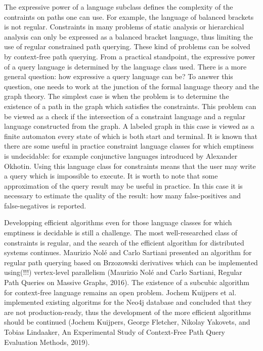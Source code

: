 \documentclass[12pt]{article}  %
\theoremstyle{remark}
\begin{document}
The expressive power of a language subclass defines the complexity of the contraints on paths one can use.
For example, the language of balanced brackets is not regular.
Constraints in many problems of static analysis or hierarchical analysis can only be expressed as a balanced bracket language, thus limiting the use of regular constrained path querying.
These kind of problems can be solved by context-free path querying.
From a practical standpoint, the expressive power of a query language is determined by the language class used.
There is a more general question: how expressive a query language can be?
To answer this question, one needs to work at the junction of the formal language theory and the graph theory.
The simplest case is when the problem is to determine the existence of a path in the graph which satisfies the constraints.
This problem can be viewed as a check if the intersection of a constraint language and a regular language constructed from the graph.
A labeled graph in this case is viewed as a finite automaton every state of which is both start and terminal.
It is known that there are some useful in practice constraint language classes for which emptiness is undecidable: for example conjunctive languages introduced by Alexander Okhotin.
Using this language class for constraints means that the user may write a query which is impossible to execute.
It is worth to note that some approximation of the query result may be useful in practice.
In this case it is necessary to estimate the quality of the result: how many false-positives and false-negatives is reported.

Developping efficient algorithms  even for those language classes for which emptiness is decidable is still a challenge.
The most well-researched class of constraints is regular, and the search of the efficient algorithm for distributed systems continues.
Maurizio Nolé and Carlo Sartiani presented an algorithm for regular path querying based on Brzozowski derivatives which can be implemented using(!!!) vertex-level parallelism (Maurizio Nolé and Carlo Sartiani, Regular Path Queries on Massive Graphs, 2016).
The existence of a subcubic algorithm for context-free language remains an open problem.
Jochem Kuijpers et al. implemented existing algoritms for the Neo4j database and concluded that they are not production-ready, thus the development of the more efficient algorithms should be continued (Jochem Kuijpers, George Fletcher, Nikolay Yakovets, and Tobias Lindaaker, An Experimental Study of Context-Free Path Query Evaluation Methods,  2019).
\end{document}

